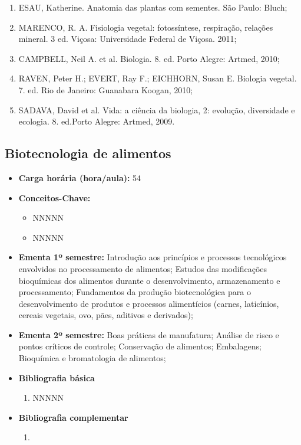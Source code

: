\documentclass[11pt,fleqn]{book} %
\begin{document}
\begin{itemize}
\begin{enumerate}
		\item ESAU, Katherine. Anatomia das plantas com sementes. São Paulo: Bluch;
		\item MARENCO, R. A. Fisiologia vegetal: fotossíntese, respiração, relações mineral. 3 ed. Viçosa: Universidade Federal de Viçosa. 2011;
		\item CAMPBELL, Neil A. et al. Biologia. 8. ed. Porto Alegre: Artmed, 2010;
		\item RAVEN, Peter H.; EVERT, Ray F.; EICHHORN, Susan E. Biologia vegetal. 7. ed. Rio de Janeiro: Guanabara Koogan, 2010;
		\item SADAVA, David et al. Vida: a ciência da biologia, 2: evolução, diversidade e ecologia. 8. ed.Porto Alegre: Artmed, 2009.
	\end{enumerate}	
\end{itemize}

\newpage
\subsection{Biotecnologia de alimentos}\label{disc:biotecAlimentos}
\begin{itemize}
	\item \textbf{Carga horária (hora/aula):} 54
	\item \textbf{Conceitos-Chave:}
	\begin{itemize}
		\item NNNNN
		\item NNNNN
	\end{itemize}
	\item \textbf{Ementa 1º semestre:}	
	Introdução aos princípios e processos tecnológicos envolvidos no processamento de alimentos;
	Estudos das modificações bioquímicas dos alimentos durante o desenvolvimento, armazenamento e processamento;
	Fundamentos da produção biotecnológica para o desenvolvimento de produtos e processos alimentícios (carnes, laticínios, cereais vegetais, ovo, pães, aditivos e derivados);
	\item \textbf{Ementa 2º semestre:}	
	Boas práticas de manufatura;
	Análise de risco e pontos críticos de controle;
	Conservação de alimentos;
	Embalagens;
	Bioquímica e bromatologia de alimentos;
	\item \textbf{Bibliografia básica}
	\begin{enumerate}
		\item NNNNN
	\end{enumerate}
	\item \textbf{Bibliografia complementar}
	\begin{enumerate}
		\item 
	\end{enumerate}	
\end{itemize}
\end{document}

